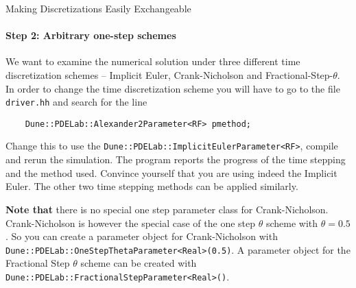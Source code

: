 \documentclass[12pt,a4paper]{article}
\begin{document}
\begin{Exercise}{Making Discretizations Easily Exchangeable}
  \paragraph{Step 2: Arbitrary one-step schemes}
  We want to examine the numerical solution under three different time
  discretization schemes -- Implicit Euler, Crank-Nicholson and
  Fractional-Step-$\theta$. In order to change the time discretization
  scheme you will have to go to the file \lstinline!driver.hh! and
  search for the line
  \begin{lstlisting}
    Dune::PDELab::Alexander2Parameter<RF> pmethod;
  \end{lstlisting}
  Change this to use the
  \lstinline!Dune::PDELab::ImplicitEulerParameter<RF>!, compile and
  rerun the simulation. The program reports the progress of the time
  stepping and the method used. Convince yourself that you are using
  indeed the Implicit Euler. The other two time stepping methods can be
  applied similarly.

  \textbf{Note that} there is no special one step parameter class for
  Crank-Nicholson.  Crank-Nicholson is however the special case of the one
  step $\theta$ scheme with $\theta=0.5$.  So you can create a parameter
  object for Crank-Nicholson with
  \lstinline!Dune::PDELab::OneStepThetaParameter<Real>(0.5)!.  A parameter
  object for the Fractional Step $\theta$ scheme can be created with
  \lstinline!Dune::PDELab::FractionalStepParameter<Real>()!.


\end{Exercise}
\end{document}
